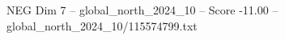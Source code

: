 \begin{textsample}{NEG Dim 7 – global\_north\_2024\_10 – Score -11.00 – global\_north\_2024\_10/115574799.txt}
\end{textsample}
